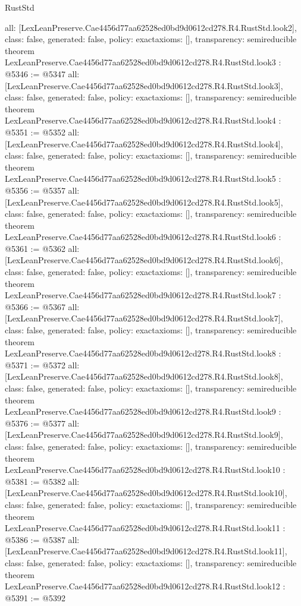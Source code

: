\begin{lexlean}{RustStd}
\begin{coremodule}
{  all: [LexLeanPreserve.Cae4456d77aa62528ed0bd9d0612cd278.R4.RustStd.look2],
  class: false,
  generated: false,
  policy: exact{axioms: []},
  transparency: semireducible
}
theorem LexLeanPreserve.Cae4456d77aa62528ed0bd9d0612cd278.R4.RustStd.look3 : @5346 := @5347 {
  all: [LexLeanPreserve.Cae4456d77aa62528ed0bd9d0612cd278.R4.RustStd.look3],
  class: false,
  generated: false,
  policy: exact{axioms: []},
  transparency: semireducible
}
theorem LexLeanPreserve.Cae4456d77aa62528ed0bd9d0612cd278.R4.RustStd.look4 : @5351 := @5352 {
  all: [LexLeanPreserve.Cae4456d77aa62528ed0bd9d0612cd278.R4.RustStd.look4],
  class: false,
  generated: false,
  policy: exact{axioms: []},
  transparency: semireducible
}
theorem LexLeanPreserve.Cae4456d77aa62528ed0bd9d0612cd278.R4.RustStd.look5 : @5356 := @5357 {
  all: [LexLeanPreserve.Cae4456d77aa62528ed0bd9d0612cd278.R4.RustStd.look5],
  class: false,
  generated: false,
  policy: exact{axioms: []},
  transparency: semireducible
}
theorem LexLeanPreserve.Cae4456d77aa62528ed0bd9d0612cd278.R4.RustStd.look6 : @5361 := @5362 {
  all: [LexLeanPreserve.Cae4456d77aa62528ed0bd9d0612cd278.R4.RustStd.look6],
  class: false,
  generated: false,
  policy: exact{axioms: []},
  transparency: semireducible
}
theorem LexLeanPreserve.Cae4456d77aa62528ed0bd9d0612cd278.R4.RustStd.look7 : @5366 := @5367 {
  all: [LexLeanPreserve.Cae4456d77aa62528ed0bd9d0612cd278.R4.RustStd.look7],
  class: false,
  generated: false,
  policy: exact{axioms: []},
  transparency: semireducible
}
theorem LexLeanPreserve.Cae4456d77aa62528ed0bd9d0612cd278.R4.RustStd.look8 : @5371 := @5372 {
  all: [LexLeanPreserve.Cae4456d77aa62528ed0bd9d0612cd278.R4.RustStd.look8],
  class: false,
  generated: false,
  policy: exact{axioms: []},
  transparency: semireducible
}
theorem LexLeanPreserve.Cae4456d77aa62528ed0bd9d0612cd278.R4.RustStd.look9 : @5376 := @5377 {
  all: [LexLeanPreserve.Cae4456d77aa62528ed0bd9d0612cd278.R4.RustStd.look9],
  class: false,
  generated: false,
  policy: exact{axioms: []},
  transparency: semireducible
}
theorem LexLeanPreserve.Cae4456d77aa62528ed0bd9d0612cd278.R4.RustStd.look10 : @5381 := @5382 {
  all: [LexLeanPreserve.Cae4456d77aa62528ed0bd9d0612cd278.R4.RustStd.look10],
  class: false,
  generated: false,
  policy: exact{axioms: []},
  transparency: semireducible
}
theorem LexLeanPreserve.Cae4456d77aa62528ed0bd9d0612cd278.R4.RustStd.look11 : @5386 := @5387 {
  all: [LexLeanPreserve.Cae4456d77aa62528ed0bd9d0612cd278.R4.RustStd.look11],
  class: false,
  generated: false,
  policy: exact{axioms: []},
  transparency: semireducible
}
theorem LexLeanPreserve.Cae4456d77aa62528ed0bd9d0612cd278.R4.RustStd.look12 : @5391 := @5392 {
}
\end{coremodule}
\end{lexlean}
